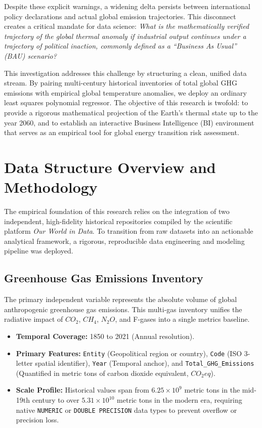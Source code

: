 \documentclass[11pt,letterpaper]{article}
\begin{document}
	Despite these explicit warnings, a widening delta persists between international policy declarations and actual global emission trajectories. This disconnect creates a critical mandate for data science: \textit{What is the mathematically verified trajectory of the global thermal anomaly if industrial output continues under a trajectory of political inaction, commonly defined as a ``Business As Usual'' (BAU) scenario?}
	
	This investigation addresses this challenge by structuring a clean, unified data stream. By pairing multi-century historical inventories of total global GHG emissions with empirical global temperature anomalies, we deploy an ordinary least squares polynomial regressor. The objective of this research is twofold: to provide a rigorous mathematical projection of the Earth's thermal state up to the year 2060, and to establish an interactive Business Intelligence (BI) environment that serves as an empirical tool for global energy transition risk assessment.

\section{Data Structure Overview and Methodology}

The empirical foundation of this research relies on the integration of two independent, high-fidelity historical repositories compiled by the scientific platform \textit{Our World in Data}. To transition from raw datasets into an actionable analytical framework, a rigorous, reproducible data engineering and modeling pipeline was deployed.

\subsection{Greenhouse Gas Emissions Inventory}
The primary independent variable represents the absolute volume of global anthropogenic greenhouse gas emissions. This multi-gas inventory unifies the radiative impact of $CO_2$, $CH_4$, $N_2O$, and F-gases into a single metrics baseline.
\begin{itemize}
	\item \textbf{Temporal Coverage:} 1850 to 2021 (Annual resolution).
	\item \textbf{Primary Features:} \texttt{Entity} (Geopolitical region or country), \texttt{Code} (ISO 3-letter spatial identifier), \texttt{Year} (Temporal anchor), and \texttt{Total\_GHG\_Emissions} (Quantified in metric tons of carbon dioxide equivalent, $CO_2eq$).
	\item \textbf{Scale Profile:} Historical values span from $6.25 \times 10^9$ metric tons in the mid-19th century to over $5.31 \times 10^{10}$ metric tons in the modern era, requiring native \texttt{NUMERIC} or \texttt{DOUBLE PRECISION} data types to prevent overflow or precision loss.
\end{itemize}
\end{document}
